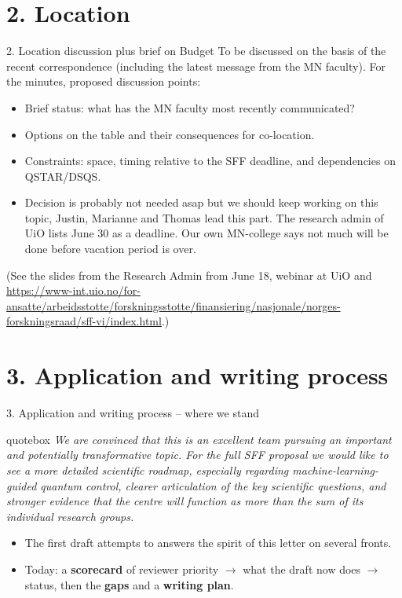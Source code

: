 \documentclass[10pt,aspectratio=169]{beamer}
\newcommand{\reviewerquote}[1]{%
  \begin{beamercolorbox}[sep=6pt,rounded=true,shadow=true]{quotebox}%
  \itshape #1%
  \end{beamercolorbox}%
}
\begin{document}
\section{2. Location}
\begin{frame}{2. Location discussion plus brief on Budget}
  To be discussed on the basis of the recent correspondence (including the latest message from
  the MN faculty). For the minutes, proposed discussion points:
  \vfill
  \begin{itemize}
    \item Brief status: what has the MN faculty most recently communicated?
    \item Options on the table and their consequences for co-location.
    \item Constraints: space, timing relative to the SFF deadline, and dependencies on QSTAR/DSQS.
    \item Decision is probably not needed asap but we should keep working on this topic, Justin, Marianne and Thomas lead this part. The research admin of UiO lists June 30 as a deadline. Our own MN-college says not much will be done before vacation period is over.
  \end{itemize}
  \vfill
  \begin{center}
    \small (See the slides from the Research Admin from June 18, webinar at UiO and \url{https://www-int.uio.no/for-ansatte/arbeidsstotte/forskningsstotte/finansiering/nasjonale/norges-forskningsraad/sff-vi/index.html}.)
  \end{center}
\end{frame}

\section{3. Application and writing process}
\begin{frame}{3. Application and writing process -- where we stand}
  \reviewerquote{We are convinced that this is an excellent team pursuing an important and
  potentially transformative topic. For the full SFF proposal we would like to see a more detailed
  scientific roadmap, especially regarding machine-learning-guided quantum control, clearer
  articulation of the key scientific questions, and stronger evidence that the centre will function
  as more than the sum of its individual research groups.}
  \vfill
  \begin{itemize}
    \item The first draft attempts to  answers the spirit of this letter on several fronts.
    \item Today: a \textbf{scorecard} of reviewer priority $\rightarrow$ what the draft now does
          $\rightarrow$ status, then the \textbf{gaps} and a \textbf{writing plan}.
  \end{itemize}
\end{frame}
\end{document}
